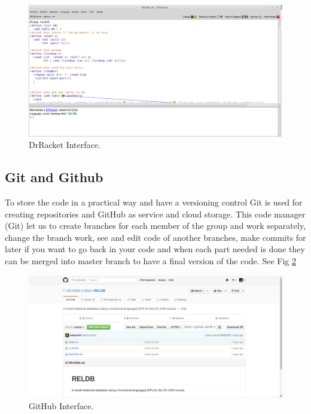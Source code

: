 \documentclass[12pt]{article}
\begin{document}
\begin{itemize}
\begin{figure}[h!]
 	\centering
  	\includegraphics[scale=0.3]
  	{Images/drracket.png}
  	\caption{DrRacket Interface.}
     \label{racket}
\end{figure}
\subsection{Git and Github}
To store the code in a practical way and have a versioning control Git is used  for creating repositories and GitHub as service and cloud storage. This code manager (Git) let us to create branches for each member of the group and work separately, change the branch work, see and edit code of another branches, make commits for later if you want to go back in your code and when each part needed is done they can be merged into master branch to have a final version of the code. See Fig \ref{git}
\begin{figure}[h!]
 	\centering
  	\includegraphics[scale=0.3]
  	{Images/GIT.png}
  	\caption{GitHub Interface.}
     \label{git}
\end{figure}


\end{itemize}
\end{document}
